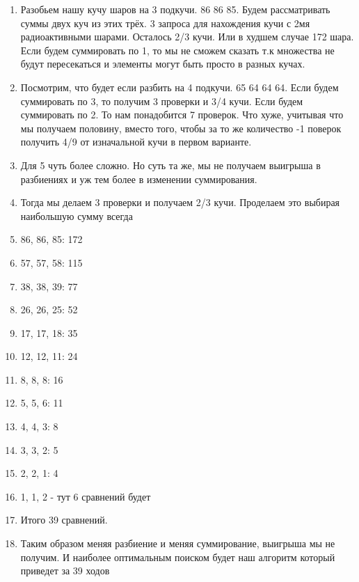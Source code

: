 \documentclass[a4paper,12pt]{article}
\begin{document}
\begin{enumerate}
    \item Разобьем нашу кучу шаров на 3 подкучи. 86 86 85. Будем рассматривать суммы двух куч из этих трёх. 3 запроса для нахождения кучи с 2мя радиоактивными шарами. Осталось 2/3 кучи. Или в худшем случае 172 шара. Если будем суммировать по 1, то мы не сможем сказать т.к множества не будут пересекаться и элементы могут быть просто в разных кучах.
    \item Посмотрим, что будет если разбить на 4 подкучи. 65 64 64 64. Если будем суммировать по 3, то получим 3 проверки и 3/4 кучи. Если будем суммировать по 2. То нам понадобится 7 проверок. Что хуже, учитывая что мы получаем половину, вместо того, чтобы за то же количество -1 поверок получить 4/9 от изначальной кучи в первом варианте.
    \item Для 5 чуть более сложно. Но суть та же, мы не получаем выигрыша в разбиениях и уж тем более в изменении суммирования.
    \item Тогда мы делаем 3 проверки и получаем 2/3 кучи. Проделаем это выбирая наибольшую сумму всегда
    \item 86, 86, 85: 172
    \item 57, 57, 58: 115 
    \item 38, 38, 39: 77
    \item 26, 26, 25: 52
    \item 17, 17, 18: 35
    \item 12, 12, 11: 24
    \item 8, 8, 8: 16
    \item 5, 5, 6: 11
    \item 4, 4, 3: 8
    \item 3, 3, 2: 5
    \item 2, 2, 1: 4
    \item 1, 1, 2 - тут 6 сравнений будет 
    \item Итого 39 сравнений.
    \item Таким образом меняя разбиение и меняя суммирование, выигрыша мы не получим. И наиболее оптимальным поиском будет наш алгоритм который приведет за 39 ходов
\end{enumerate}
\end{document}
